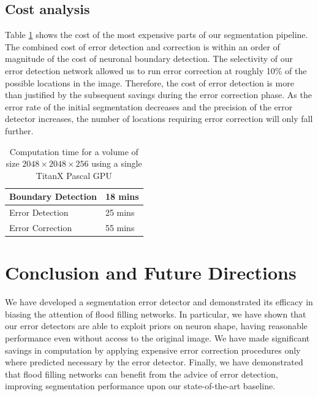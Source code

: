 \documentclass{article}
\begin{document}

\subsection{Cost analysis}
Table \ref{table:timing} shows the cost of the most expensive parts of our segmentation pipeline. The combined cost of error detection and correction is within an order of magnitude of the cost of neuronal boundary detection. The selectivity of our error detection network allowed us to run error correction at roughly 10\% of the possible locations in the image. Therefore, the cost of error detection is more than justified by the subsequent savings during the error correction phase. As the error rate of the initial segmentation decreases and the precision of the error detector increases, the number of locations requiring error correction will only fall further.

\begin{table}[h]
	\caption{Computation time for a volume of size $2048\times 2048\times 256$ using a single TitanX Pascal GPU}
\label{table:timing}
  \centering
  \begin{tabular}{ll}
	  \toprule
	Boundary Detection & 18 mins\\
	\midrule
	Error Detection & 25 mins\\
	\midrule
	Error Correction & 55 mins\\
	\bottomrule
  \end{tabular}
\end{table}

\section{Conclusion and Future Directions}
We have developed a segmentation error detector and demonstrated its efficacy in biasing the attention of flood filling networks. In particular, we have shown that our error detectors are able to exploit priors on neuron shape, having reasonable performance even without access to the original image. We have made significant savings in computation by applying expensive error correction procedures only where predicted necessary by the error detector. Finally, we have demonstrated that flood filling networks can benefit from the advice of error detection, improving segmentation performance upon our state-of-the-art baseline.
\end{document}
